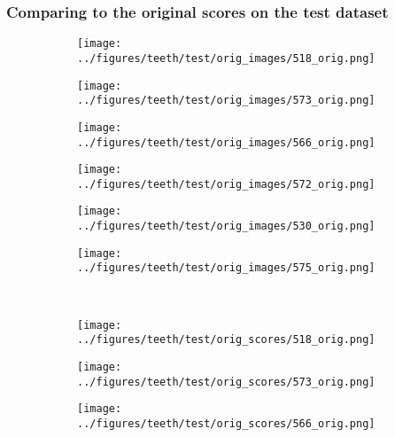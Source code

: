 \subsubsection{Comparing to the original scores on the test dataset}
\begin{figure}[h!]
	\begin{subfigure}{0.16\textwidth}
		\centering
		\texttt{[image: ../figures/teeth/test/orig\_images/518\_orig.png]}
		\label{fig:1}
	\end{subfigure}
	\begin{subfigure}{0.16\textwidth}
		\centering
		\texttt{[image: ../figures/teeth/test/orig\_images/573\_orig.png]}
		\label{fig:1}
	\end{subfigure}
	\begin{subfigure}{0.16\textwidth}
		\centering
		\texttt{[image: ../figures/teeth/test/orig\_images/566\_orig.png]}
		\label{fig:1}
	\end{subfigure}
	\begin{subfigure}{0.16\textwidth}
		\centering
		\texttt{[image: ../figures/teeth/test/orig\_images/572\_orig.png]}
		\label{fig:1}
	\end{subfigure}
	\begin{subfigure}{0.16\textwidth}
		\centering
		\texttt{[image: ../figures/teeth/test/orig\_images/530\_orig.png]}
		\label{fig:1}
	\end{subfigure}
	\begin{subfigure}{0.16\textwidth}
		\centering
		\texttt{[image: ../figures/teeth/test/orig\_images/575\_orig.png]}
		\label{fig:1}
	\end{subfigure}
	\vspace{-0.35cm}
	\\
	\begin{subfigure}{0.16\textwidth}
		\centering
		\texttt{[image: ../figures/teeth/test/orig\_scores/518\_orig.png]}
		\label{fig:1}
	\end{subfigure}
	\begin{subfigure}{0.16\textwidth}
		\centering
		\texttt{[image: ../figures/teeth/test/orig\_scores/573\_orig.png]}
		\label{fig:1}
	\end{subfigure}
	\begin{subfigure}{0.16\textwidth}
		\centering
		\texttt{[image: ../figures/teeth/test/orig\_scores/566\_orig.png]}
		\label{fig:1}
	\end{subfigure}

\end{figure}
